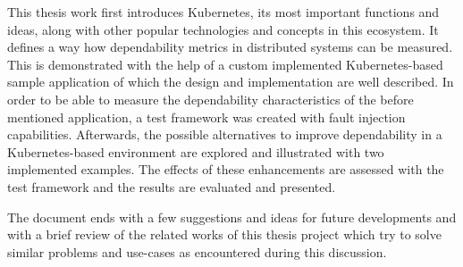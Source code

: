 This thesis work first introduces Kubernetes, its most important functions and ideas, along with other popular technologies and concepts in this ecosystem. It defines a way how dependability metrics in distributed systems can be measured. This is demonstrated with the help of a custom implemented Kubernetes-based sample application of which the design and implementation are well described. In order to be able to measure the dependability characteristics of the before mentioned application, a test framework was created with fault injection capabilities. Afterwards, the possible alternatives to improve dependability in a Kubernetes-based environment are explored and illustrated with two implemented examples. The effects of these enhancements are assessed with the test framework and the results are evaluated and presented.

The document ends with a few suggestions and ideas for future developments and with a brief review of the related works of this thesis project which try to solve similar problems and use-cases as encountered during this discussion.


\vfill
\selectthesislanguage

\setcounter{romanPage}{\value{page}}
